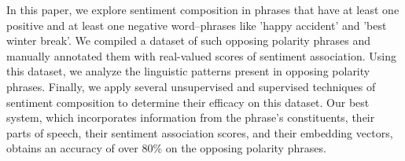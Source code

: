 In this paper, we explore sentiment composition in phrases that have at least one positive and at least one negative word--phrases like 'happy accident' and 'best winter break'. We compiled a dataset of such opposing polarity phrases and manually annotated them with real-valued scores of sentiment association. Using this dataset, we analyze the linguistic patterns present in opposing polarity phrases. Finally, we apply several unsupervised and supervised techniques of sentiment composition to determine their efficacy on this dataset. Our best system, which incorporates information from the phrase's constituents, their parts of speech, their sentiment association scores, and their embedding vectors, obtains an accuracy of over 80\% on the opposing polarity phrases.
